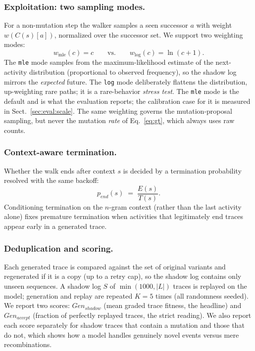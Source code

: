 \documentclass[runningheads]{llncs}
\newcommand{\chg}[1]{\textcolor{chgblue}{#1}}
\newcommand{\genshadow}{\ensuremath{\mathit{Gen}_{\mathit{shadow}}}}
\newcommand{\genaccept}{\ensuremath{\mathit{Gen}_{\mathit{accept}}}}
\newcommand{\pend}{\ensuremath{p_{\mathit{end}}}}
\begin{document}
\subsubsection{Exploitation: two sampling modes.}
For a non-mutation step the walker samples a seen successor $a$ with weight $w(C(s)[a])$, normalized over the successor set. We support two weighting modes:
\begin{equation}
w_{\mathrm{mle}}(c)=c \qquad\text{vs.}\qquad w_{\mathrm{log}}(c)=\ln(c+1).
\end{equation}
The \texttt{mle} mode samples from the maximum-likelihood estimate of the next-activity distribution (proportional to observed frequency), so the shadow log mirrors the \emph{expected} future. The \texttt{log} mode deliberately flattens the distribution, up-weighting rare paths; it is a rare-behavior \emph{stress test}. \chg{The \texttt{mle} mode is the default and is what the evaluation reports; the calibration case for it is measured in Sect.~\ref{sec:eval:scale}.} The same weighting governs the mutation-proposal sampling, but never the mutation \emph{rate} of Eq.~\eqref{eq:gt}, which always uses raw counts.

\subsubsection{Context-aware termination.}
Whether the walk ends after context $s$ is decided by a termination probability resolved with the same backoff:
\begin{equation}
\pend(s) \;=\; \frac{E(s)}{T(s)}.
\end{equation}
Conditioning termination on the $n$-gram context (rather than the last activity alone) fixes premature termination when activities that legitimately end traces appear early in a generated trace.

\subsubsection{Deduplication and scoring.}
Each generated trace is compared against the set of original variants and regenerated if it is a copy (up to a retry cap), so the shadow log contains only unseen sequences. A shadow log $S$ of $\min(1000,|L|)$ traces is replayed on the model; generation and replay are repeated $K{=}5$ times (all randomness seeded). We report two scores: \genshadow{} (mean graded trace fitness, the headline) and \genaccept{} (fraction of perfectly replayed traces, the strict reading). We also report each score separately for shadow traces that contain a mutation and those that do not, which shows how a model handles genuinely novel events versus mere recombinations.
\end{document}

